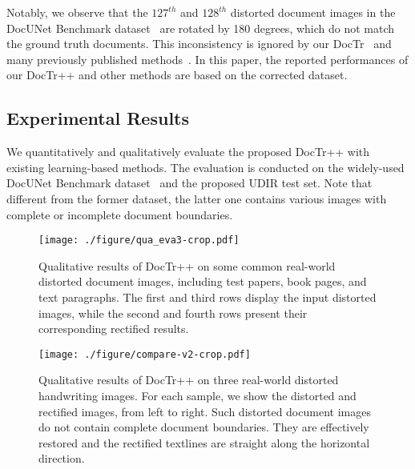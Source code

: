 \documentclass[lettersize,journal]{IEEEtran}
\begin{document}
Notably, we observe that the $127^{th}$ and $128^{th}$ distorted document images in the DocUNet Benchmark dataset~\cite{8578592} are rotated by 180 degrees,
which do not match the ground truth documents.
This inconsistency is ignored by our DocTr~\cite{feng2021doctr} and many previously published methods~\cite{9010747,das2021end,feng2021doctr,jiang2022revisiting,liu2020geometric,8578592,xie2021document,xie2020dewarping,xue2022fourier,markovitz2020can,ma2022learning,zhang2022marior,li2019document}.
In this paper,
the reported performances of our DocTr++ and other methods are based on the corrected dataset.

\subsection{Experimental Results}
We quantitatively and qualitatively evaluate the proposed DocTr++ with existing learning-based methods.
The evaluation is conducted on the widely-used DocUNet Benchmark dataset~\cite{8578592} and the proposed UDIR test set.
Note that different from the former dataset, the latter one contains various images with complete or incomplete document boundaries.

\begin{figure*}[t]
  \centering
  \texttt{[image: ./figure/qua\_eva3-crop.pdf]}
  \caption{Qualitative results of DocTr++ on some common real-world distorted document images, including test papers, book pages, and text paragraphs. The first and third rows display the input distorted images, while the second and fourth rows present their corresponding rectified results.}
  \label{fig:qua_eva2}
\end{figure*}

\begin{figure*}[t]
  \centering
  \texttt{[image: ./figure/compare-v2-crop.pdf]}
  \caption{Qualitative results of DocTr++ on three real-world distorted handwriting images. For each sample, we show the distorted and rectified images, from left to right. Such distorted document images do not contain complete document boundaries. They are effectively restored and the rectified textlines are straight along the horizontal direction.
  }
  \label{fig:hand}
\end{figure*}
\end{document}
